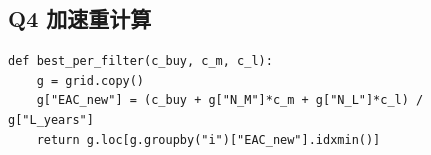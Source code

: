 \documentclass[12pt, a4paper, fontset=fandol]{ctexart}
\theoremstyle{definition}
\begin{document}
\subsection{Q4 加速重计算}
\begin{lstlisting}[caption={Q4 step1\_single\_param\_sweep.py 加速}]
def best_per_filter(c_buy, c_m, c_l):
    g = grid.copy()
    g["EAC_new"] = (c_buy + g["N_M"]*c_m + g["N_L"]*c_l) / g["L_years"]
    return g.loc[g.groupby("i")["EAC_new"].idxmin()]
\end{lstlisting}
\end{document}
